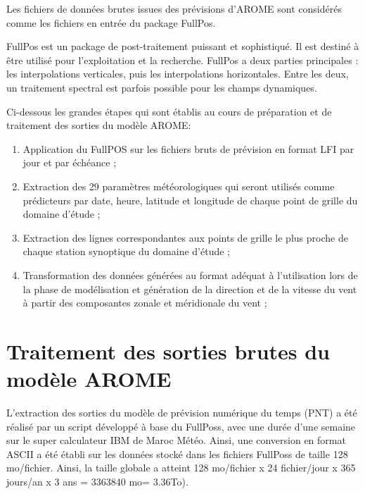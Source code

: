Les fichiers de données brutes issues des prévisions d’AROME sont considérés comme les fichiers en entrée du package FullPos.

\begin{tcolorbox}
\footnotesize {
FullPos est un package de post-traitement puissant et sophistiqué. Il est destiné à être utilisé pour l'exploitation et la recherche. FullPos a deux parties principales : les interpolations verticales, puis les interpolations horizontales. Entre les deux, un traitement spectral est parfois possible pour les champs dynamiques.
}
\end{tcolorbox}

Ci-dessous les grandes étapes qui sont établis au cours de préparation et de traitement des sorties du modèle AROME:
\begin{enumerate}
    \item Application du FullPOS sur les fichiers bruts de prévision en format LFI par jour et par échéance ;
    \item Extraction des 29 paramètres météorologiques qui seront utilisés comme prédicteurs par date, heure, latitude et longitude de chaque point de grille du domaine d’étude ;
    \item Extraction des lignes correspondantes aux points de grille le plus proche de chaque station
synoptique du domaine d’étude ;
    \item Transformation des données générées au format adéquat à l’utilisation lors de la phase de
modélisation et génération de la direction et de la vitesse du vent à partir des composantes
zonale et méridionale du vent ;
\end{enumerate}

\section{Traitement des sorties brutes du modèle AROME}
 L’extraction des sorties du modèle de prévision numérique du temps (PNT) a été réalisé par un script développé à base du FullPoss, avec une durée d’une semaine sur le super calculateur IBM de Maroc Météo. Ainsi, une conversion en format ASCII a été établi sur les données stocké dans les fichiers FullPoss de taille 128 mo/fichier. Ainsi, la taille globale a atteint 128 mo/fichier x 24 fichier/jour x 365 jours/an x 3 ans = 3363840 mo= 3.36To). \\

